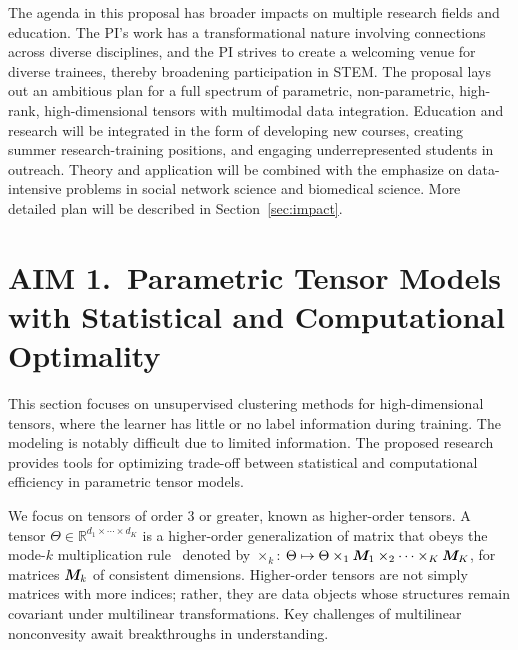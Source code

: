 \documentclass[11pt]{article}
\DeclareRobustCommand{\mybox}[2][gray!20]{%
\begin{tcolorbox}[   %
        breakable,
        left=0pt,
        right=0pt,
        top=0pt,
        bottom=0pt,
        colback=#1,
        colframe=#1,
        width=\dimexpr\textwidth\relax, 
        enlarge left by=0mm,
        boxsep=5pt,
        arc=0pt,outer arc=0pt,
        ]
        #2
\end{tcolorbox}}
\DeclareRobustCommand{\mybox}[2][gray!20]{%
\begin{tcolorbox}[   %
        breakable,
        left=0pt,
        right=0pt,
        top=0pt,
        bottom=0pt,
        colback=#1,
        colframe=#1,
        width=\dimexpr\textwidth\relax, 
        enlarge left by=0mm,
        boxsep=5pt,
        arc=0pt,outer arc=0pt,
        ]
        #2
\end{tcolorbox}
}
\theoremstyle{exampstyle}
\theoremstyle{definition}
\begin{document}
The agenda in this proposal has broader impacts on multiple research fields and education. The PI’s work has a transformational nature involving connections across diverse disciplines, and the PI strives to create a welcoming venue for diverse trainees, thereby broadening participation in STEM. The proposal lays out an ambitious plan for a full spectrum of parametric, non-parametric, high-rank, high-dimensional tensors with multimodal data integration. Education and research will be integrated in the form of developing new courses, creating summer research-training positions, and engaging underrepresented students in outreach. Theory and application will be combined with the emphasize on data-intensive problems in social network science and biomedical science. More detailed plan will be described in Section~\ref{sec:impact}. 


\section{AIM 1.\ Parametric Tensor Models with Statistical and Computational Optimality}\label{sec:theme1}
\vspace{-.4cm}

\mybox[gray!20]{
This section focuses on unsupervised clustering methods for high-dimensional tensors, where the learner has little or no label information during training. The modeling is notably difficult due to limited information. The proposed research provides tools for optimizing trade-off between statistical and computational efficiency in parametric tensor models.}

We focus on tensors of order 3 or greater, known as higher-order tensors. A tensor $\Theta \in  \mathbb{R}^{d_1 \times\cdots \times d_K}$ is a higher-order generalization of matrix that obeys the mode-$k$ multiplication rule~\cite{kolda2009tensor} denoted by $\times_k$: $\Theta\mapsto \Theta\times_1\bm M_1\times_2\cdots\times_K\bm M_K$, for matrices $\bm M_k$ of consistent dimensions. Higher-order tensors are not simply matrices with more indices; rather, they are data objects whose structures remain covariant under multilinear transformations. Key challenges of multilinear nonconvesity await breakthroughs in understanding. 

\vspace{-.5cm}
\end{document}
